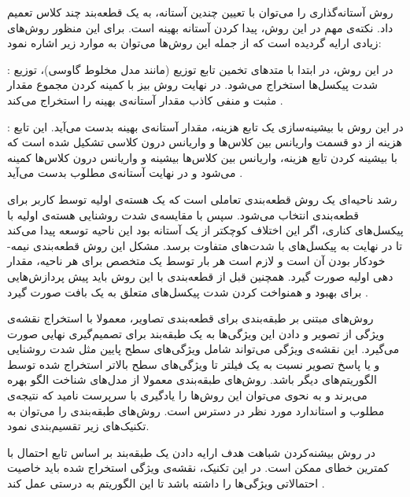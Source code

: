 روش آستانه‌گذاری را می‌توان با تعیین چندین آستانه، به یک قطعه‌بند چند کلاس تعمیم داد. نکته‌ی مهم در این روش، پیدا کردن آستانه بهینه است. برای این منظور روش‌های زیادی ارایه گردیده‌ است که از جمله این روش‌ها می‌توان به موارد زیر اشاره نمود:

 : در این روش، در ابتدا با متدهای تخمین تابع توزیع (مانند مدل مخلوط گاوسی)، توزیع شدت پیکسل‌ها استخراج می‌شود. در نهایت روش بیز با کمینه کردن مجموع مقدار  مثبت و منفی کاذب مقدار آستانه‌ی بهینه را استخراج می‌کند .

 : در این روش با بیشینه‌سازی یک تابع هزینه، مقدار آستانه‌ی بهینه بدست می‌آید. این تابع هزینه از دو قسمت واریانس بین کلاس‌ها و واریانس درون کلاسی تشکیل شده است که با بیشینه کردن تابع هزینه، واریانس بین کلاس‌ها بیشینه و واریانس درون کلاس‌ها کمینه می‌شود و در نهایت آستانه‌ی مطلوب بدست می‌آید .

رشد ناحیه‌ای یک روش قطعه‌بندی تعاملی است که یک هسته‌ی اولیه توسط کاربر برای قطعه‌بندی انتخاب می‌شود. سپس با مقایسه‌ی شدت روشنایی هسته‌ی اولیه با پیکسل‌های کناری، اگر این اختلاف کوچکتر از یک آستانه بود این ناحیه توسعه پیدا می‌کند تا در نهایت به پیکسل‌های با شدت‌های متفاوت برسد. مشکل این روش قطعه‌بندی نیمه-خودکار بودن آن است و لازم است هر بار توسط یک متخصص برای هر ناحیه، مقدار دهی اولیه صورت گیرد. همچنین قبل از قطعه‌بندی با این روش باید پیش پردازش‌هایی برای بهبود و همنواخت کردن شدت پیکسل‌های متعلق به یک بافت صورت گیرد .

روش‌های مبتنی بر طبقه‌بندی برای قطعه‌بندی تصاویر، معمولا با استخراج نقشه‌ی ویژگی از تصویر و دادن این ویژگی‌ها به یک طبقه‌بند برای تصمیم‌گیری نهایی صورت می‌گیرد. این نقشه‌ی ویژگی می‌تواند شامل ویژگی‌های سطح پایین مثل شدت روشنایی و یا پاسخ تصویر نسبت به یک فیلتر تا ویژگی‌های سطح بالاتر استخراج شده توسط الگوریتم‌های دیگر باشد. روش‌های طبقه‌بندی معمولا از مدل‌های شناخت الگو بهره می‌برند و به نحوی می‌توان این روش‌ها را یادگیری با سرپرست نامید که نتیجه‌ی مطلوب و استاندارد مورد نظر در دسترس است. روش‌های طبقه‌بندی را می‌توان به تکنیک‌های زیر تقسیم‌بندی نمود.

در روش‌‌ بیشنه‌کردن شباهت هدف ارایه دادن یک طبقه‌بند بر اساس تابع احتمال با کمترین خطای ممکن است. در این تکنیک، نقشه‌ی ویژگی استخراج شده باید خاصیت احتمالاتی ویژگی‌ها را داشته باشد تا این الگوریتم به درستی عمل کند .

